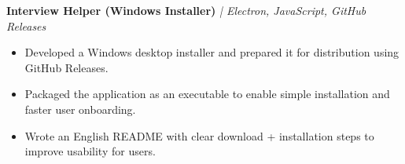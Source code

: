 
\vspace{2pt}
\noindent\textbf{Interview Helper (Windows Installer)} 
\href{https://github.com/sandeep2421-hub}{\faGithub}
\textit{| Electron, JavaScript, GitHub Releases}
\begin{itemize}[leftmargin=*]
\item Developed a Windows desktop installer and prepared it for distribution using GitHub Releases.
\item Packaged the application as an executable to enable simple installation and faster user onboarding.
\item Wrote an English README with clear download + installation steps to improve usability for users.
\end{itemize}

